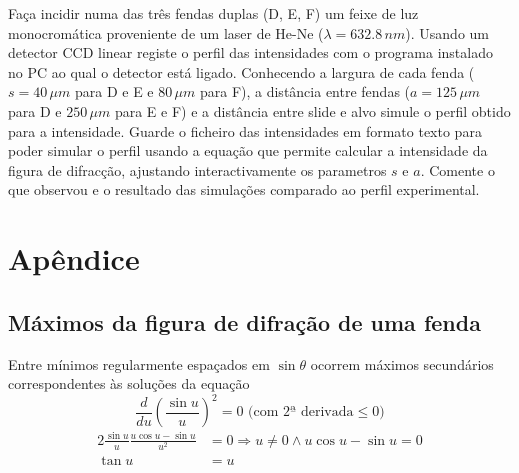 \documentclass[a4paper,12pt]{article}
\begin{document}
Faça incidir numa das três fendas duplas (D, E, F) um feixe de luz monocromática 
proveniente de um laser de He-Ne ($\lambda=632.8\,nm$).  
Usando um detector CCD linear registe o perfil das intensidades com o programa instalado 
no PC ao qual o detector está ligado. Conhecendo a largura de cada fenda ($s=40\, 
\mu m$ para D e E e $80\,\mu m$ para F), a distância entre fendas ($a=125\,\mu m$ para D e 
$250\,\mu m$  para  E  e  F) e a distância entre slide e alvo  simule  o  perfil  obtido  para  a  intensidade.  Guarde  o  ficheiro  das 
intensidades  em  formato  texto  para  poder  simular  o  perfil  usando  a  equação  que 
permite calcular a intensidade da figura de difracção, ajustando interactivamente os parametros $s$ e $a$. 
Comente  o  que  observou  e  o  resultado  das  simulações  comparado  ao  perfil 
experimental. 

\section{\sf Apêndice}
\subsection{Máximos da figura de difração de uma fenda} \label{sec:maxfenda}
Entre mínimos regularmente espaçados em $\sin \theta $ ocorrem máximos secundários correspondentes às soluções da equação 
\begin{equation}
	\label{eq:35} \frac{d}{d u} \left( \frac{\sin u}{u} \right)^2 = 0 \text{ (com 2ª derivada} \le 0) 
\end{equation}
\begin{align}
	\label{eq:36} 2 \frac{\sin u}{u} \frac{u \cos u- \sin u}{u^2} &= 0 \Rightarrow u \ne 0 \land u \cos u- \sin u =0\nonumber \\
	\tan u &= u 
\end{align}

\end{document}

